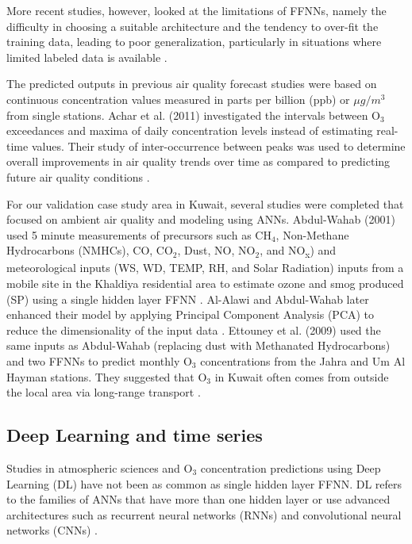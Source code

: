 More recent studies, however, looked at the limitations of FFNNs, namely the difficulty in choosing a suitable architecture and the tendency to over-fit the training data, leading to poor generalization, particularly in situations where limited labeled data is available \citep{Lu2005, Papaleonidas2013}.  

The predicted outputs in previous air quality forecast studies \citep{Arhami2013} were based on continuous concentration values measured in parts per billion (ppb) or $\mu g/m^{3}$ from single stations. Achar et al. (2011) investigated the intervals between O$_{3}$ exceedances and maxima of daily concentration levels instead of estimating real-time values. Their study of inter-occurrence between peaks was used to determine overall improvements in air quality trends over time as compared to predicting future air quality conditions \citep{Achcar2011}. 

For our validation case study area in Kuwait, several studies were completed that focused on ambient air quality and modeling using ANNs. Abdul-Wahab (2001) used 5 minute measurements of precursors such as CH$_{4}$, Non-Methane Hydrocarbons (NMHCs), CO, CO$_{2}$, Dust, NO, NO$_{2}$, and NO\textsubscript{x}) and meteorological inputs (WS, WD, TEMP, RH, and Solar Radiation) inputs from a mobile site in the Khaldiya residential area to estimate ozone and smog produced (SP)  using a single hidden layer FFNN \citep{AbdulWahab2001}. Al-Alawi and Abdul-Wahab later enhanced their model by applying Principal Component Analysis (PCA) to reduce the dimensionality of the input data \citep{AlAlawi2008}.  Ettouney et al. (2009) used the same inputs as Abdul-Wahab (replacing dust with Methanated Hydrocarbons) and two FFNNs to predict monthly O$_{3}$ concentrations from the Jahra and Um Al Hayman stations. They suggested that O$_{3}$ in Kuwait often comes from outside the local area via long-range transport \citep{Ettouney2009a}. 

\subsection{Deep Learning and time series}
Studies in atmospheric sciences and O$_{3}$ concentration predictions using Deep Learning (DL) have not been as common as single hidden layer FFNN. DL refers to the families of ANNs that have more than one hidden layer or use advanced architectures such as recurrent neural networks (RNNs) and convolutional neural networks (CNNs) \citep{Goodfellow2016}. 

